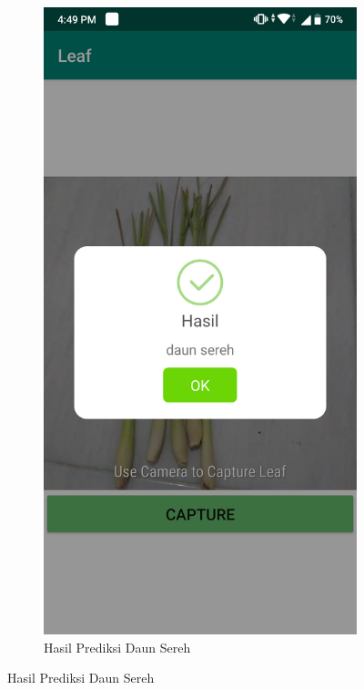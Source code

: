 \begin{figure}[ht]
	\begin{subfigure}{0.5\textwidth}
		\centering\includegraphics[width=\linewidth]{bab5/figures/ss2hasil.png}
		\caption{Hasil Prediksi Daun Sereh}
		\label{fig:hasil2}

\end{subfigure}
\end{figure}
